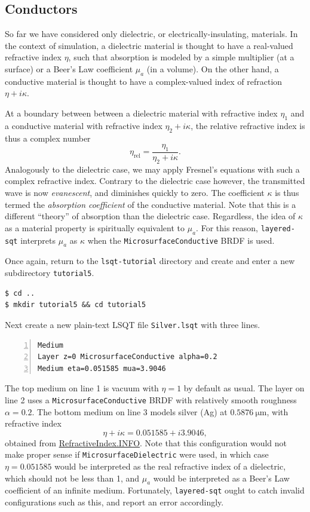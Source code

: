 \documentclass[
    twoside,
    twocolumn,
    letterpaper,
    10pt]{article}
\newcommand\namett[2]{{\color{code#1}\texttt{#2}}}
\begin{document}
\subsection{Conductors}
\label{sec:tutorial5}

So far we have considered only dielectric, or electrically-insulating, 
materials. In the context of simulation, a dielectric material is 
thought to have a real-valued refractive index $\eta$, such that 
absorption is modeled by a simple multiplier
(at a surface) or a Beer's Law coefficient $\mu_a$ (in a volume). 
On the other hand, a conductive material is thought to have a complex-valued
index of refraction $\eta + i\kappa$.

At a boundary between between a dielectric material with refractive 
index $\eta_1$ and a conductive material with refractive index 
$\eta_2 + i \kappa$, the relative refractive index is thus a 
complex number
\begin{equation*}
    \eta_{\text{rel}} = \frac{\eta_1}{\eta_2 + i \kappa}.
\end{equation*}
Analogously to the dielectric case, we may apply Fresnel's 
equations with such a complex refractive index. Contrary to the
dielectric case however, the transmitted wave is now \emph{evanescent},
and diminishes quickly to zero. The coefficient $\kappa$ is thus
termed the \emph{absorption coefficient} of the conductive material. 
Note that this is a different ``theory'' of absorption
than the dielectric case. Regardless, the idea of $\kappa$ as a 
material property is spiritually equivalent to $\mu_a$.
For this reason, \texttt{layered-sqt} interprets $\mu_a$ as $\kappa$
when the \namett{purple}{MicrosurfaceConductive} BRDF is used. 

Once again, return to the \texttt{lsqt-tutorial} directory and create
and enter a new subdirectory \texttt{tutorial5}.
\begin{verbatim}
$ cd ..
$ mkdir tutorial5 && cd tutorial5
\end{verbatim}
Next create a new plain-text LSQT file \texttt{Silver.lsqt} with
three lines.
\begin{lstlisting}[numbers=left]
Medium
Layer z=0 MicrosurfaceConductive alpha=0.2
Medium eta=0.051585 mua=3.9046
\end{lstlisting}

The top medium on line 1 is vacuum with $\eta = 1$ by default as 
usual. The layer on line 2 uses a \namett{purple}{MicrosurfaceConductive} 
BRDF with relatively smooth roughness $\alpha = 0.2$. The bottom medium on 
line 3 models silver (Ag) at $\SI{0.5876}{\micro\meter}$, with refractive index
\begin{equation*}
    \eta + i\kappa = 0.051585 + i3.9046,
\end{equation*}
obtained from \href{https://refractiveindex.info}{RefractiveIndex.INFO}.
Note that this configuration would not make proper sense if 
\namett{purple}{MicrosurfaceDielectric} were used, in
which case $\eta=0.051585$ would be interpreted as the real refractive 
index of a dielectric, which should not be less than 1, and $\mu_a$ would be 
interpreted as a Beer's Law coefficient of an infinite medium. 
Fortunately, \texttt{layered-sqt} ought to catch invalid configurations such
as this, and report an error accordingly.
\end{document}
